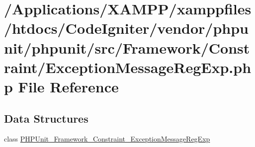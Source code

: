 \hypertarget{_exception_message_reg_exp_8php}{}\section{/\+Applications/\+X\+A\+M\+P\+P/xamppfiles/htdocs/\+Code\+Igniter/vendor/phpunit/phpunit/src/\+Framework/\+Constraint/\+Exception\+Message\+Reg\+Exp.php File Reference}
\label{_exception_message_reg_exp_8php}
\subsection*{Data Structures}
\begin{DoxyCompactItemize}
\item 
class \mbox{\hyperlink{class_p_h_p_unit___framework___constraint___exception_message_reg_exp}{P\+H\+P\+Unit\+\_\+\+Framework\+\_\+\+Constraint\+\_\+\+Exception\+Message\+Reg\+Exp}}
\end{DoxyCompactItemize}
